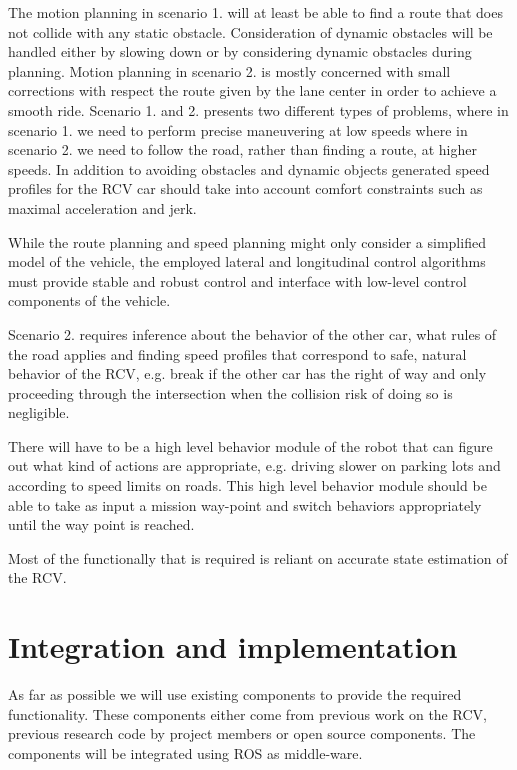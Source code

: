 \documentclass[11pt,a4paper]{article}
\begin{document}
The motion planning in scenario 1. will at least be able to find a
route that does not collide with any static obstacle.  Consideration
of dynamic obstacles will be handled either by slowing down or by
considering dynamic obstacles during planning. Motion planning in
scenario 2.  is mostly concerned with small corrections with respect
the route given by the lane center in order to achieve a smooth
ride. Scenario 1. and 2. presents two different types of problems,
where in scenario 1. we need to perform precise maneuvering at low
speeds where in scenario 2. we need to follow the road, rather than
finding a route, at higher speeds. In addition to avoiding obstacles
and dynamic objects generated speed profiles for the RCV car should
take into account comfort constraints such as maximal acceleration and
jerk.

While the route planning and speed planning might only consider a
simplified model of the vehicle, the employed lateral and longitudinal
control algorithms must provide stable and robust control and interface
with low-level control components of the vehicle.

Scenario 2. requires inference about the behavior of the other car,
what rules of the road applies and finding speed profiles that
correspond to safe, natural behavior of the RCV, e.g. break if the
other car has the right of way and only proceeding through the
intersection when the collision risk of doing so is negligible.

There will have to be a high level behavior module of the robot that
can figure out what kind of actions are appropriate, e.g. driving
slower on parking lots and according to speed limits on roads. This
high level behavior module should be able to take as input a mission
way-point and switch behaviors appropriately until the way point is
reached.

Most of the functionally that is required is reliant on accurate
state estimation of the RCV.

\section{Integration and implementation}

As far as possible we will use existing components to provide the
required functionality. These components either come from previous
work on the RCV, previous research code by project members or open
source components. The components will be integrated using ROS as middle-ware.
\end{document}
